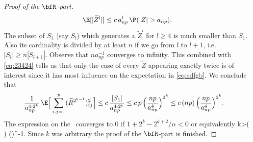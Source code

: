 \begin{proof}[Proof of the $\bfR$-part]
\begin{equation}
\E[|\widetilde{Z}^l|] \le c\, a_{np}^{l}\, \P(|Z| > a_{np}).
\end{equation}
The subset of $S_1$ (say $S_l$) which generates a  $\widetilde{Z}^l$ for $l\ge 4$ is much smaller than $S_1$. Also its cardinality is divided by at least $n$ if we go from $l$ to $l+1$, i.e. $|S_l|\ge n |S_{l+1}|$. Observe that $n a_{np}^{-1}$ converges to infinity. This combined with \eqref{eq:23424} tells us that only the case of every $\widetilde{Z}$ appearing exactly twice is of interest since it has most 
influence on the expectation in \eqref{eq:sdfgb}. We conclude that
\begin{equation*}
\begin{split}
\dfrac{1}{a_{np}^{4 \cdot 2^k}}\, \E \Big[\sum_{i,j=1}^p (\widetilde{R}^{2^{k-1}})_{ij}^2 \Big]
&\le c\, \dfrac{|S_1|}{a_{np}^{4 \cdot 2^k}}\le c\,p\, \Big( \frac{np}{a_{np}^4} \Big)^{2^k}\le c\, (np)\,  \Big( \frac{np}{a_{np}^4} \Big)^{2^{k}}.
\end{split}
\end{equation*}
The  expression on the \rhs\ converges to $0$ if $1+2^{k}-2^{k+2}/\alpha <0$ or equivalently
\beao
k>\log\Big( \Big) ()^{-1}.
\eeao
Since $k$ was arbitrary the proof of the $\bfR$-part is finished.
\end{proof}

